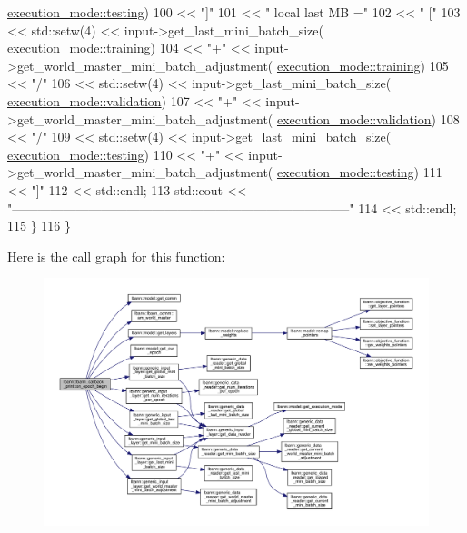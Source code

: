 \begin{DoxyCode}
      \hyperlink{base_8hpp_a2781a159088df64ed7d47cc91c4dc0a8aae2b1fca515949e5d54fb22b8ed95575}{execution\_mode::testing})
100               << \textcolor{stringliteral}{"]"}
101               << \textcolor{stringliteral}{"  local last MB ="}
102               << \textcolor{stringliteral}{" ["}
103               << std::setw(4) << input->get\_last\_mini\_batch\_size(
      \hyperlink{base_8hpp_a2781a159088df64ed7d47cc91c4dc0a8ac185ddac8b5a8f5aa23c5b80bc12d214}{execution\_mode::training})
104               << \textcolor{stringliteral}{"+"} << input->get\_world\_master\_mini\_batch\_adjustment(
      \hyperlink{base_8hpp_a2781a159088df64ed7d47cc91c4dc0a8ac185ddac8b5a8f5aa23c5b80bc12d214}{execution\_mode::training})
105               << \textcolor{stringliteral}{"/"}
106               << std::setw(4) << input->get\_last\_mini\_batch\_size(
      \hyperlink{base_8hpp_a2781a159088df64ed7d47cc91c4dc0a8aa617908b172c473cb8e8cda059e55bf0}{execution\_mode::validation})
107               << \textcolor{stringliteral}{"+"} << input->get\_world\_master\_mini\_batch\_adjustment(
      \hyperlink{base_8hpp_a2781a159088df64ed7d47cc91c4dc0a8aa617908b172c473cb8e8cda059e55bf0}{execution\_mode::validation})
108               << \textcolor{stringliteral}{"/"}
109               << std::setw(4) << input->get\_last\_mini\_batch\_size(
      \hyperlink{base_8hpp_a2781a159088df64ed7d47cc91c4dc0a8aae2b1fca515949e5d54fb22b8ed95575}{execution\_mode::testing})
110               << \textcolor{stringliteral}{"+"} << input->get\_world\_master\_mini\_batch\_adjustment(
      \hyperlink{base_8hpp_a2781a159088df64ed7d47cc91c4dc0a8aae2b1fca515949e5d54fb22b8ed95575}{execution\_mode::testing})
111               << \textcolor{stringliteral}{"]"}
112               << std::endl;
113     std::cout << \textcolor{stringliteral}{"--------------------------------------------------------------------------------"}
114               << std::endl;
115   \}
116 \}
\end{DoxyCode}
Here is the call graph for this function\+:\nopagebreak
\begin{figure}[H]
\begin{center}
\leavevmode
\includegraphics[width=350pt]{classlbann_1_1lbann__callback__print_ae3c99d7c56ac33ab7e09880134b43cad_cgraph}
\end{center}
\end{figure}
